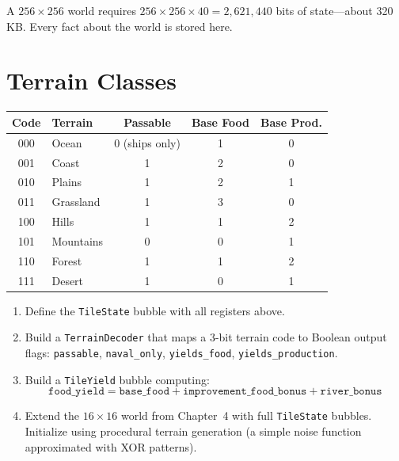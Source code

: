 \documentclass[11pt,a4paper,openany]{book}
\theoremstyle{plain}
\theoremstyle{definition}
\theoremstyle{remark}
\newenvironment{project}[1]{%
  \begin{tcolorbox}[
    title={\textbf{Project: #1}},
    colback=projectbg,
    colframe=sphereblue,
    fonttitle=\bfseries\color{white},
    coltitle=white,
    attach boxed title to top left={yshift=-2mm, xshift=4mm},
    boxed title style={colback=sphereblue, sharp corners},
    sharp corners,
    breakable,
    before upper={\normalfont\setlength{\parindent}{0pt}\tolerance=9999\hbadness=9999}
  ]
}{\end{tcolorbox}}
\begin{document}
A $256 \times 256$ world requires $256 \times 256 \times 40 = 2{,}621{,}440$ bits
of state---about 320 KB. Every fact about the world is stored here.

\section{Terrain Classes}

\begin{center}
\begin{tabular}{clccc}
  \toprule
  \textbf{Code} & \textbf{Terrain} & \textbf{Passable} & \textbf{Base Food}
                & \textbf{Base Prod.} \\
  \midrule
  000 & Ocean      & 0 (ships only) & 1 & 0 \\
  001 & Coast      & 1              & 2 & 0 \\
  010 & Plains     & 1              & 2 & 1 \\
  011 & Grassland  & 1              & 3 & 0 \\
  100 & Hills      & 1              & 1 & 2 \\
  101 & Mountains  & 0              & 0 & 1 \\
  110 & Forest     & 1              & 1 & 2 \\
  111 & Desert     & 1              & 0 & 1 \\
  \bottomrule
\end{tabular}
\end{center}

\begin{project}{Tile Architecture}
  \begin{enumerate}
    \item Define the \texttt{TileState} bubble with all registers above.
    \item Build a \texttt{TerrainDecoder} that maps a 3-bit terrain code
          to Boolean output flags: \texttt{passable}, \texttt{naval\_only},
          \texttt{yields\_food}, \texttt{yields\_production}.
    \item Build a \texttt{TileYield} bubble computing:
          \[
            \texttt{food\_yield} = \texttt{base\_food} +
            \texttt{improvement\_food\_bonus} +
            \texttt{river\_bonus}
          \]
    \item Extend the $16\times 16$ world from Chapter~4 with full
          \texttt{TileState} bubbles. Initialize using procedural terrain
          generation (a simple noise function approximated with XOR patterns).
  \end{enumerate}
\end{project}
\end{document}
